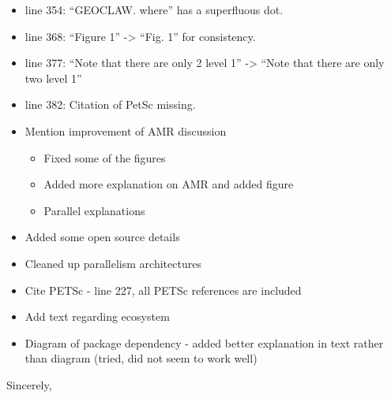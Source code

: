 \documentclass{letter}
\begin{document}
\begin{letter}
\begin{itemize}
    \item line 354: ``GEOCLAW. where'' has a superfluous dot.

    \item line 368: ``Figure 1'' -> ``Fig. 1'' for consistency.

    \item line 377: ``Note that there are only 2 level 1'' -> ``Note that there
    are only two level 1''

    \item line 382: Citation of PetSc missing.
\end{itemize}

\begin{itemize}
    \item Mention improvement of AMR discussion
    \begin{itemize}
        \item Fixed some of the figures
        \item Added more explanation on AMR and added figure
        \item Parallel explanations
    \end{itemize}
    \item Added some open source details
    \item Cleaned up parallelism architectures
    \item Cite PETSc - line 227, all PETSc references are included
    \item Add text regarding ecosystem
    \item Diagram of package dependency - added better explanation in text
    rather than diagram (tried, did not seem to work well)
\end{itemize}


\vspace{4cm}

\closing{Sincerely,}

\end{letter}
\end{document}
